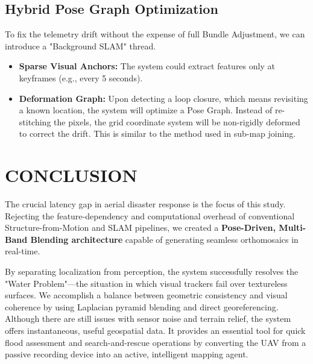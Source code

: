 \documentclass[conference]{IEEEtran}
\begin{document}
\subsection{Hybrid Pose Graph Optimization}
To fix the telemetry drift without the expense of full Bundle Adjustment, we can introduce a "Background SLAM" thread.
\begin{itemize}
    \item \textbf{Sparse Visual Anchors:} The system could extract features only at keyframes (e.g., every 5 seconds).
    \item \textbf{Deformation Graph:} Upon detecting a loop closure, which means revisiting a known location, the system will optimize a Pose Graph. Instead of re-stitching the pixels, the grid coordinate system will be non-rigidly deformed to correct the drift. This is similar to the method used in sub-map joining.
\end{itemize}

\section{CONCLUSION}
The crucial latency gap in aerial disaster response is the focus of this study. Rejecting the feature-dependency and computational overhead of conventional Structure-from-Motion and SLAM pipelines, we created a \textbf{Pose-Driven, Multi-Band Blending architecture} capable of generating seamless orthomosaics in real-time.

By separating localization from perception, the system successfully resolves the "Water Problem"—the situation in which visual trackers fail over textureless surfaces. We accomplish a balance between geometric consistency and visual coherence by using Laplacian pyramid blending and direct georeferencing. Although there are still issues with sensor noise and terrain relief, the system offers instantaneous, useful geospatial data. It provides an essential tool for quick flood assessment and search-and-rescue operations by converting the UAV from a passive recording device into an active, intelligent mapping agent.
\end{document}
